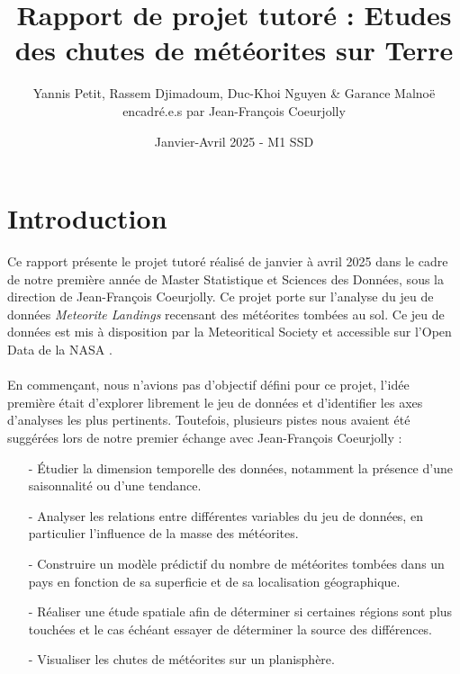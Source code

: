 \documentclass[12pt]{article}
\begin{document}
\title{Rapport de projet tutoré : Etudes des chutes de météorites sur Terre}
\author{Yannis Petit, Rassem Djimadoum, Duc-Khoi Nguyen \& Garance Malnoë \\ encadré.e.s par Jean-François Coeurjolly}
\date{Janvier-Avril 2025 - M1 SSD}

\maketitle
\tableofcontents
\clearpage
{}
\section{Introduction}
Ce rapport présente le projet tutoré réalisé de janvier à avril 2025 dans le cadre de notre première année de Master Statistique et Sciences des Données, sous la direction de Jean-François Coeurjolly. Ce projet porte sur l'analyse du jeu de données \textit{Meteorite Landings} recensant des météorites tombées au sol. Ce jeu de données est mis à disposition par la Meteoritical Society et accessible sur l'Open Data de la NASA \cite{OpenData_NASA}.\\
\\
En commençant, nous n'avions pas d'objectif défini pour ce projet, l'idée première était d'explorer librement le jeu de données et d'identifier les axes d'analyses les plus pertinents. Toutefois, plusieurs pistes nous avaient été suggérées lors de notre premier échange avec Jean-François Coeurjolly :\\
\begin{itemize}
	\item[-] Étudier la dimension temporelle des données, notamment la présence d'une saisonnalité ou d'une tendance.\\
	\item[-] Analyser les relations entre différentes variables du jeu de données, en particulier l'influence de la masse des 		météorites.\\
	\item[-] Construire un modèle prédictif du nombre de météorites tombées dans un pays en fonction de sa superficie et de sa localisation géographique.\\
	\item[-] Réaliser une étude spatiale afin de déterminer si certaines régions sont plus touchées et le cas échéant essayer de déterminer la source des différences.\\
	\item[-] Visualiser les chutes de météorites sur un planisphère.\\
\end{itemize}
\end{document}
